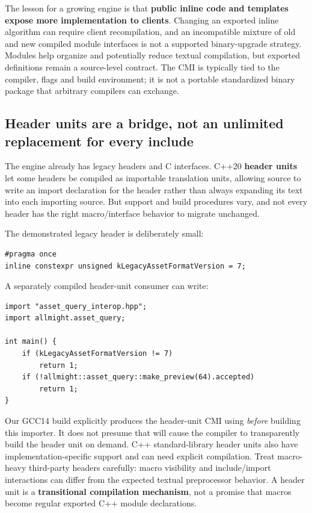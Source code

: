 The lesson for a growing engine is that \textbf{public inline code and templates expose more implementation to clients}. Changing an exported inline algorithm can require client recompilation, and an incompatible mixture of old and new compiled module interfaces is not a supported binary-upgrade strategy. Modules help organize and potentially reduce textual compilation, but exported definitions remain a source-level contract. The CMI is typically tied to the compiler, flags and build environment; it is not a portable standardized binary package that arbitrary compilers can exchange.

\subsection{Header units are a bridge, not an unlimited replacement for every include}\label{01-foundations-i-ch006-header-units-are-a-bridge-not-an-unlimited-replacement-for-every-include}

\hypertarget{01-foundations-i-ch006-header-units-are-a-bridge-not-an-unlimited-replacement-for-every-include}{}

The engine already has legacy headers and C interfaces. C++20 \textbf{header units} let some headers be compiled as importable translation units, allowing source to write an import declaration for the header rather than always expanding its text into each importing source. But support and build procedures vary, and not every header has the right macro/interface behavior to migrate unchanged.

The demonstrated legacy header is deliberately small:

\begin{verbatim}
#pragma once
inline constexpr unsigned kLegacyAssetFormatVersion = 7;
\end{verbatim}

A separately compiled header-unit consumer can write:

\begin{verbatim}
import "asset_query_interop.hpp";
import allmight.asset_query;

int main() {
    if (kLegacyAssetFormatVersion != 7)
        return 1;
    if (!allmight::asset_query::make_preview(64).accepted)
        return 1;
}
\end{verbatim}

Our GCC14 build explicitly produces the header-unit CMI using  \emph{before} building this importer. It does not presume that  will cause the compiler to transparently build the header unit on demand. C++ standard-library header units also have implementation-specific support and can need explicit compilation. Treat macro-heavy third-party headers carefully: macro visibility and include/import interactions can differ from the expected textual preprocessor behavior. A header unit is a \textbf{transitional compilation mechanism}, not a promise that macros become regular exported C++ module declarations.

